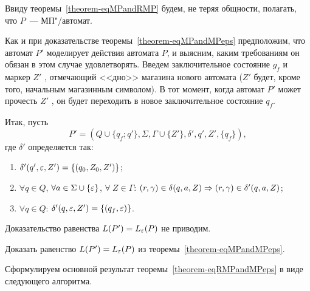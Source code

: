 \begin{myproof}
Ввиду теоремы~\ref{theorem-eqMPandRMP} будем, не теряя общности, полагать, что
$P$~--- МП"/автомат.

Как и при доказательстве теоремы~\ref{theorem-eqMPandMPeps} предположим, что автомат $P'$ моделирует действия автомата $P$, и выясним, каким требованиям он обязан в этом случае удовлетворять. Введем заключительное состояние $g_f$ и маркер $Z'$ , отмечающий <<дно>> магазина нового автомата ($Z'$ будет, кроме того, начальным магазинным символом). В тот момент, когда автомат $P'$ может прочесть $Z'$ , он будет переходить в новое заключительное состояние $q_f$.

Итак, пусть
\[
P' = (Q\cup\{q_f;q'\},\Sigma,\Gamma\cup\{Z'\},\delta' ,q' ,Z' ,\{q_f\}),
\]
где $\delta'$ определяется так:
\begin{enumerate}
    \item $\delta' (q',\varepsilon,Z')=\{(q_0,Z_0,Z')\}$;

    \item $\forall q\in Q$, $\forall a\in\Sigma\cup\{\varepsilon\}$,
    $\forall\ Z\in\Gamma$:
        $(r,\gamma)\in\delta(q,a,Z)\Rightarrow(r,\gamma)\in\delta'(q,a,Z)$;

    \item $\forall q\in Q$: $\delta'(q,\varepsilon,Z')=\{(q_f,\varepsilon)\}$.
\end{enumerate}

Доказательство равенства $L(P')=L_\varepsilon(P)$ не приводим.
\end{myproof}

\begin{myproblem}
Доказать равенство $L(P')=L_\varepsilon(P)$ из теоремы~\ref{theorem-eqMPandMPeps}.
\end{myproblem}

Сформулируем основной результат теоремы~\ref{theorem-eqRMPandMPeps} в виде следующего алгоритма.

